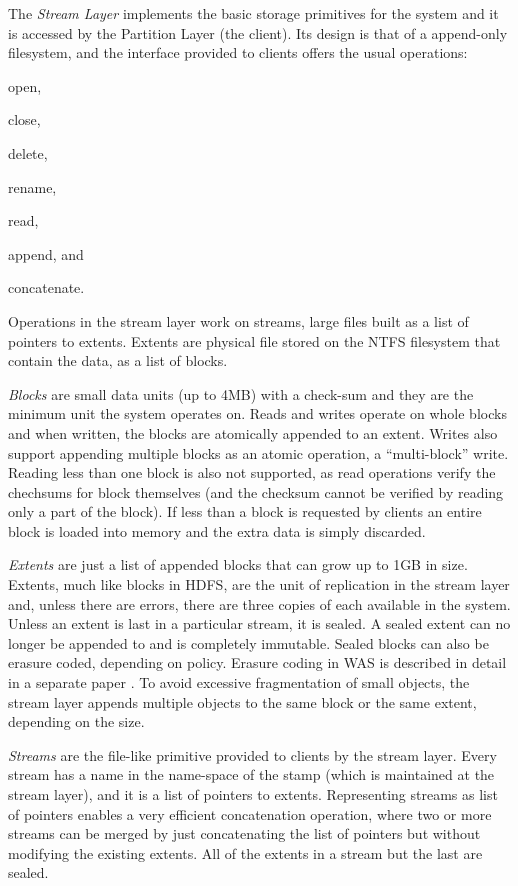 The \emph{Stream Layer} implements the basic storage primitives for the system and it is accessed by the Partition Layer (the client).
Its design is that of a append-only filesystem, and the interface provided to clients offers the usual operations:
\begin{inparaenum}[i)]
    \item open,
    \item close,
    \item delete,
    \item rename,
    \item read,
    \item append, and
    \item concatenate.
\end{inparaenum}
Operations in the stream layer work on streams, large files built as a list of pointers to extents.
Extents are physical file stored on the NTFS filesystem that contain the data, as a list of blocks.

\emph{Blocks} are small data units (up to 4MB) with a check-sum and they are the minimum unit the system operates on.
Reads and writes operate on whole blocks and when written, the blocks are atomically appended to an extent.
Writes also support appending multiple blocks as an atomic operation, a ``multi-block'' write.
Reading less than one block is also not supported, as read operations verify the chechsums for block themselves (and the checksum cannot be verified by reading only a part of the block).
If less than a block is requested by clients an entire block is loaded into memory and the extra data is simply discarded.

\emph{Extents} are just a list of appended blocks that can grow up to 1GB in size.
Extents, much like blocks in HDFS, are the unit of replication in the stream layer and, unless there are errors, there are three copies of each available in the system.
Unless an extent is last in a particular stream, it is sealed.
A sealed extent can no longer be appended to and is completely immutable.
Sealed blocks can also be erasure coded, depending on policy.
Erasure coding in WAS is described in detail in a separate paper \cite{DBLP:conf/usenix/HuangSXOCG0Y12}.
To avoid excessive fragmentation of small objects, the stream layer appends multiple objects to the same block or the same extent, depending on the size.

\emph{Streams} are the file-like primitive provided to clients by the stream layer.
Every stream has a name in the name-space of the stamp (which is maintained at the stream layer), and it is a list of pointers to extents.
Representing streams as list of pointers enables a very efficient concatenation operation, where two or more streams can be merged by just concatenating the list of pointers but without modifying the existing extents.
All of the extents in a stream but the last are sealed.

